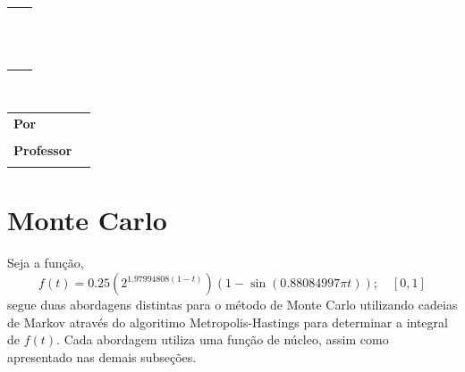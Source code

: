 \documentclass [a4paper,10pt]{article}
\newcommand{\n}[1]{\textbf{#1}}
\begin{document}
  \thispagestyle{fancy}
  \fancyhf{}
  \renewcommand{\footrulewidth}{0.0pt}
  \renewcommand{\headrulewidth}{0.0pt}
  \cfoot{\bfseries \thepage}

  \begin{flushleft}
    \begin{tabular}{ l l }
      \multirow{2}{*}{\rule{0.15\textwidth}{48pt}} & \hspace{-3.5mm}{\large Exercício de Programa 3:}\\[2mm] 
      & \hspace{-3.5mm}{\huge \n{Monte Carlo com Metropolis-Hastings}}\\[-2.85mm]
      & \hspace{-4.5mm}\rule{1.1\textwidth}{1.6pt}
    \end{tabular}
  \end{flushleft}
  \begin{center}
    \vspace{-2.5mm}
    \\[0.5cm]
    \hspace{-5.5cm}\begin{tabular}{ l l }
      \n{Por} & \\[-2mm]
      & \hspace{-10mm}{\small Caio Vinícius Dadauto$\qquad$7994808}\\
      \n{Professor} & \\[-2mm]
      & \hspace{-10mm}{\small Julio Michael Stern}\\[4mm]
    \end{tabular}
  \end{center}
  \vspace{2cm}

  \section{Monte Carlo}
  	Seja a função,
  	\begin{equation}
  		f(t) = 0.25(2^{1.97994808(1-t)})(1 - \sin(0.88084997\pi t));\quad [0, 1]
  	\end{equation}
  	segue duas abordagens distintas para o método de Monte Carlo utilizando cadeias 
  	de Markov através do algoritimo Metropolis-Hastings para determinar a integral de $f(t)$.
  	Cada abordagem utiliza uma função de núcleo, assim como apresentado nas demais subseções.
\end{document}

